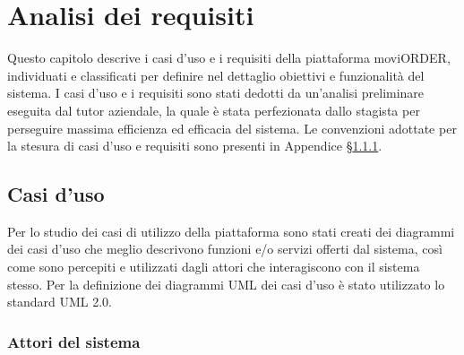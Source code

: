 
\chapter{Analisi dei requisiti}
\label{cap:analisi-requisiti}

Questo capitolo descrive i casi d'uso e i requisiti della piattaforma moviORDER, individuati e classificati per definire nel dettaglio obiettivi e funzionalità del sistema. I casi d'uso e i requisiti sono stati dedotti da un'analisi preliminare eseguita dal tutor aziendale, la quale è stata perfezionata dallo stagista per perseguire massima efficienza ed efficacia del sistema. Le convenzioni adottate per la stesura di casi d'uso e requisiti sono presenti in Appendice §\ref{}.

\section{Casi d'uso}

Per lo studio dei casi di utilizzo della piattaforma sono stati creati dei diagrammi dei casi d'uso che meglio descrivono funzioni e/o servizi offerti dal sistema, così come sono percepiti e utilizzati dagli attori che interagiscono con il sistema stesso. Per la definizione dei diagrammi UML dei casi d'uso è stato utilizzato lo standard UML 2.0.

\subsection{Attori del sistema}

